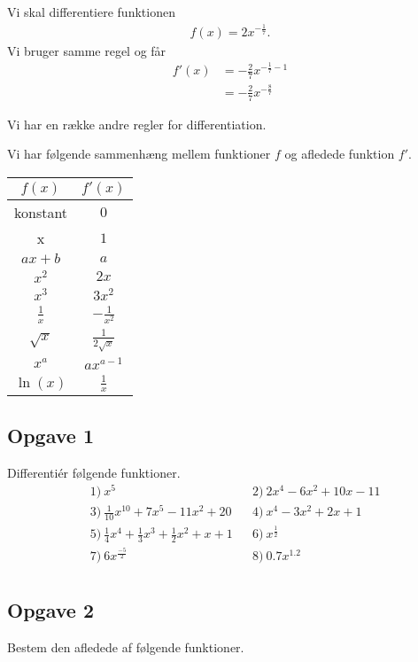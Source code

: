 \begin{exa}
	Vi skal differentiere funktionen 
	\begin{align*}
		f(x) = 2x^{-\frac{1}{7}}.
	\end{align*}
	Vi bruger samme regel og får
	\begin{align*}
	 	f'(x) &= -\frac{2}{7}x^{-\frac{1}{7}-1} \\
	 	&= -\frac{2}{7}x^{-\frac{8}{7}}
	\end{align*}
\end{exa}

Vi har en række andre regler for differentiation.
\begin{setn}
Vi har følgende sammenhæng mellem funktioner $f$ og afledede funktion $f'$.
\begin{center}
\begin{tabular}{c|c}
$f(x)$& $f'(x)$\\
\hline
\textnormal{konstant}&$0$\\
\hline
x&$1$\\
\hline
$ax+b$&$a$\\
\hline
$x^2$&$2x$\\
\hline
$x^3$&$3x^2$\\
\hline
$\frac{1}{x}$&$-\frac{1}{x^2}$\\
\hline
$\sqrt{x}$&$\frac{1}{2\sqrt{x}}$\\
\hline
$x^a$ & $ax^{a-1}$\\
\hline
$\ln(x)$ & $\frac{1}{x}$

\end{tabular}
\end{center}
\end{setn}

\subsection*{Opgave 1}
Differentiér følgende funktioner.
\begin{align*}
	&1) \ x^5   &&2) \ 2x^4-6x^2+10x-11     \\
	&3) \ \frac{1}{10}x^{10}+7x^5-11x^2+20  &&4) \ x^4-3x^2+2x+1     \\ 
	&5) \ \frac{1}{4}x^4 + \frac{1}{3}x^3+\frac{1}{2}x^2+x + 1  &&6) \  x^\frac{1}{2}    \\ 
	&7) \ 6x^{\frac{-5}{2}}  &&8) \  0.7x^{1.2}    \\ 
\end{align*}

\subsection*{Opgave 2}
Bestem den afledede af følgende funktioner.

